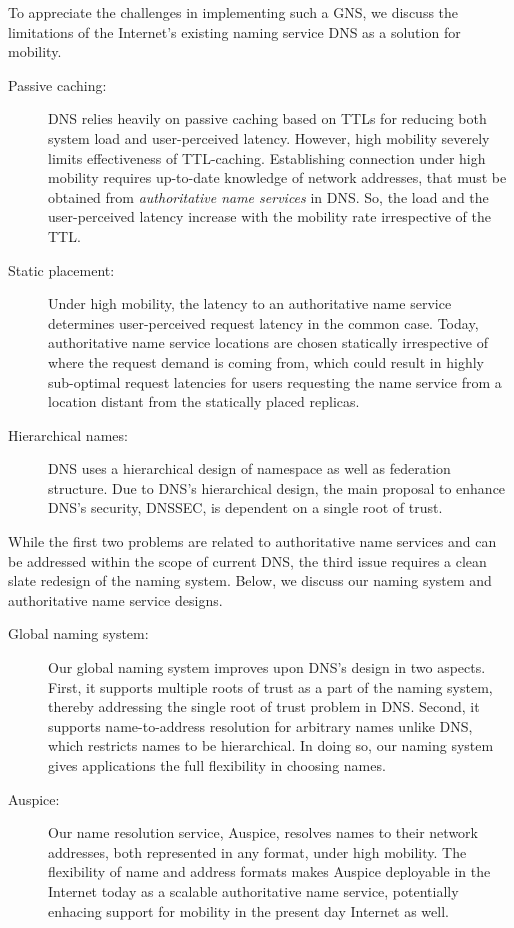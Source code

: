To appreciate the challenges in implementing such a GNS, we discuss the limitations of the Internet's existing naming service DNS as a solution for mobility.
\begin{description}
	\item[Passive caching:] 
	DNS relies heavily on passive caching based on TTLs for reducing both system load and user-perceived latency. However, high mobility severely limits effectiveness of TTL-caching. Establishing connection under high mobility requires up-to-date knowledge of network addresses, that must be obtained from \emph{authoritative name services} in DNS. So, the load and the user-perceived latency increase with the mobility rate irrespective of the TTL.
	\item[Static placement:] 
	Under high mobility, the latency to an authoritative name service determines user-perceived request latency in the common case. Today, authoritative name service locations are chosen statically irrespective of where the request demand is coming from, which could result in highly sub-optimal request latencies for users requesting the name service from a location distant from the statically placed replicas. 
	\item[Hierarchical names:]
	DNS uses a hierarchical design of namespace as well as federation structure. Due to DNS's hierarchical design, the main proposal to enhance DNS's security, DNSSEC, is dependent on a single root of trust. 
\end{description}

While the first two problems are related to authoritative name services and can be addressed within the scope of current DNS, the third issue requires a clean slate redesign of the naming system.   Below, we discuss our naming system and authoritative name service designs.
\begin{description}
	\item[Global naming system:] Our global naming system improves upon DNS's design in two aspects. First, it supports multiple roots of trust as a part of the naming system, thereby addressing the single root of trust problem in DNS. Second, it supports name-to-address resolution for arbitrary names unlike DNS, which restricts names to be hierarchical. In doing so, our naming system gives applications the full flexibility in choosing names. 
	\item[Auspice:] Our name resolution service, Auspice, resolves names to their network addresses, both represented in any format, under high mobility. The flexibility of name and address formats makes Auspice deployable in the Internet today as a scalable authoritative name service, potentially enhacing support for mobility in the present day Internet as well. 
\end{description}

